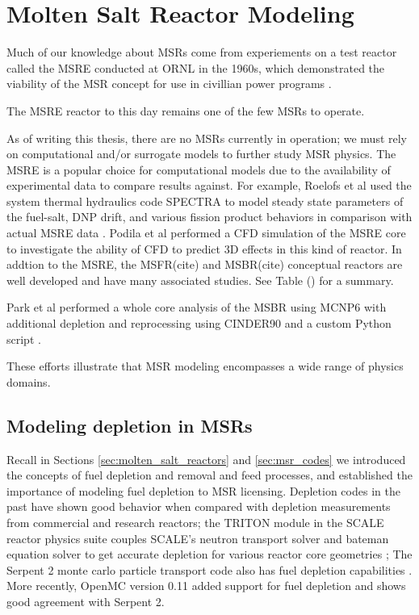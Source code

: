\chapter{Molten Salt Reactor Modeling}%
\label{cha:msr_modeling}
Much of our knowledge about \Gls{MSR}s come from experiements on a test reactor called the \Gls{MSRE} conducted at \Gls{ORNL} in the 1960s, which demonstrated the viability of the \Gls{MSR} concept for use in civillian power programs \cite{haubenreich_experience_1970} \cite{rosenthal_molten-salt_1970}.

The \Gls{MSRE} reactor to this day remains one of the few \Gls{MSR}s to operate.

As of writing this thesis, there are no \Gls{MSR}s currently in operation; we must rely on computational and/or surrogate models to further study \Gls{MSR} physics. The \Gls{MSRE} is a popular choice for computational models due to the availability of experimental data to compare results against. For example, Roelofs et al used the system thermal hydraulics code SPECTRA to model steady state parameters of the fuel-salt, \Gls{DNP} drift, and various fission product behaviors
in comparison with actual MSRE data \cite{roelofs_molten_2021}.  Podila et al performed a \Gls{CFD} simulation of the \Gls{MSRE} core to investigate the ability of \Gls{CFD} to predict 3D effects in this kind of reactor\cite{podila_cfd_2019}. 
In addtion to the \Gls{MSRE}, the \Gls{MSFR}(cite) and \Gls{MSBR}(cite) conceptual reactors are well developed and have many associated studies. See Table () for a summary.


Park et al performed a whole core analysis of the \Gls{MSBR} using MCNP6 with additional depletion and reprocessing using CINDER90 and a custom Python script \cite{park_whole_2015}.

These efforts illustrate that \Gls{MSR} modeling encompasses a wide range of physics domains.

\section{Modeling depletion in \Gls{MSR}s}
Recall in Sections
\ref{sec:molten_salt_reactors} and \ref{sec:msr_codes} we introduced the concepts of fuel depletion and removal and feed processes, and established the importance of modeling fuel depletion to \Gls{MSR} licensing. Depletion codes in the past have shown good behavior when compared with depletion measurements from commercial and research reactors; the TRITON module in the SCALE reactor physics suite couples SCALE's neutron transport solver and bateman equation
solver to get
accurate depletion for various reactor core geometries \cite{dehart_reactor_2011};
The Serpent 2 monte carlo particle transport code also has fuel depletion capabilities \cite{leppanen_burnup_2009}. More recently, OpenMC version 0.11 added support for fuel depletion and shows good agreement with Serpent 2\cite{romano_depletion_2021}.

